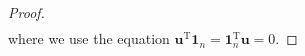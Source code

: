 \begin{proof}
\begin{align}
\end{align}
where we use the equation   $ \mathbf u^{\mathrm T}\mathbf 1_{n} = \mathbf 1_{n} ^{\mathrm T} \mathbf u =  0 $. 



\end{proof}

